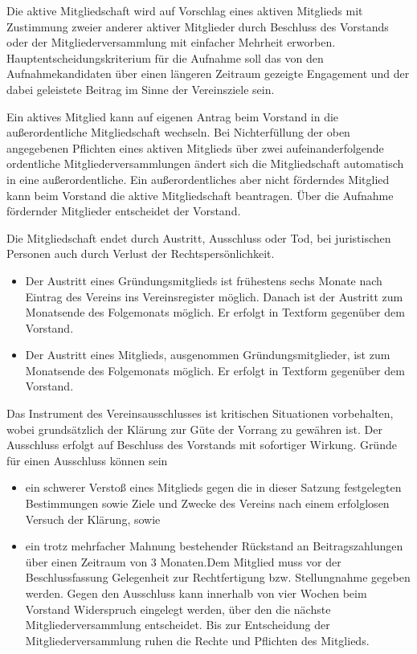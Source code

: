 \documentclass[12pt,ngerman]{scrartcl}
\begin{document}
\begin{contract}
Die aktive Mitgliedschaft wird auf Vorschlag eines aktiven Mitglieds mit Zustimmung zweier anderer aktiver Mitglieder durch Beschluss des Vorstands oder der Mitgliederversammlung mit einfacher Mehrheit erworben. Hauptentscheidungskriterium für die Aufnahme soll das von den Aufnahmekandidaten über einen längeren Zeitraum gezeigte Engagement und der dabei geleistete Beitrag im Sinne der Vereinsziele sein.

Ein aktives Mitglied kann auf eigenen Antrag beim Vorstand in die außerordentliche Mitgliedschaft wechseln. Bei Nichterfüllung der oben angegebenen Pflichten eines aktiven Mitglieds über zwei aufeinanderfolgende ordentliche Mitgliederversammlungen ändert sich die Mitgliedschaft automatisch in eine außerordentliche. Ein außerordentliches aber nicht förderndes Mitglied kann beim Vorstand die aktive Mitgliedschaft beantragen. Über die Aufnahme fördernder Mitglieder entscheidet der Vorstand.

Die Mitgliedschaft endet durch Austritt, Ausschluss oder Tod, bei juristischen Personen auch durch Verlust der Rechtspersönlichkeit.

\begin{itemize}
	\item Der Austritt eines Gründungsmitglieds ist frühestens sechs Monate nach Eintrag des Vereins ins Vereinsregister möglich. Danach ist der Austritt zum Monatsende des Folgemonats möglich. Er erfolgt in Textform gegenüber dem Vorstand.
	\item Der Austritt eines Mitglieds, ausgenommen Gründungsmitglieder, ist zum Monatsende des Folgemonats möglich. Er erfolgt in Textform gegenüber dem Vorstand.
\end{itemize}

Das Instrument des Vereinsausschlusses ist kritischen Situationen vorbehalten, wobei grundsätzlich der Klärung zur Güte der Vorrang zu gewähren ist. Der Ausschluss erfolgt auf Beschluss des Vorstands mit sofortiger Wirkung. Gründe für einen Ausschluss können sein

\begin{itemize}
	\item ein schwerer Verstoß eines Mitglieds gegen die in dieser Satzung festgelegten Bestimmungen sowie Ziele und Zwecke des Vereins nach einem erfolglosen Versuch der Klärung, sowie
	\item ein trotz mehrfacher Mahnung bestehender Rückstand an Beitragszahlungen über einen Zeitraum von 3 Monaten.Dem Mitglied muss vor der Beschlussfassung Gelegenheit zur Rechtfertigung bzw. Stellungnahme gegeben werden. Gegen den Ausschluss kann innerhalb von vier Wochen beim Vorstand Widerspruch eingelegt werden, über den die nächste Mitgliederversammlung entscheidet. Bis zur Entscheidung der Mitgliederversammlung ruhen die Rechte und Pflichten des Mitglieds.
\end{itemize}




\end{contract}
\end{document}
